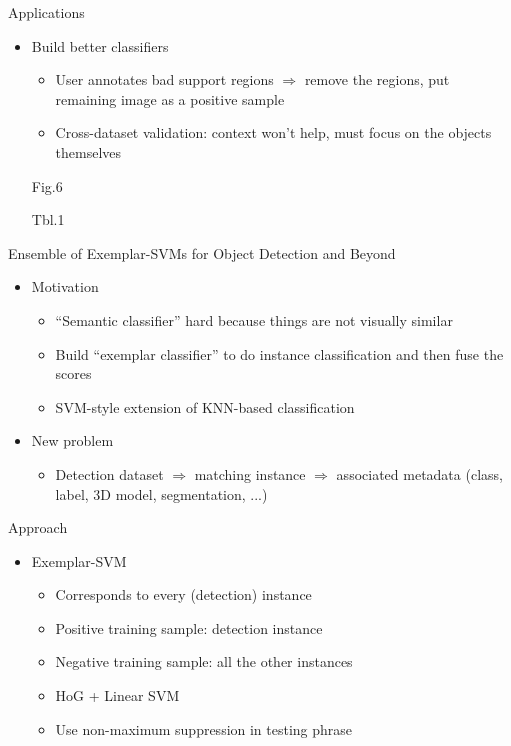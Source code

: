 \documentclass[12pt]{beamer}
\begin{document}
\begin{frame}{Applications}
    \begin{itemize}
        \item Build better classifiers
        \begin{itemize}
            \item User annotates bad support regions $\Rightarrow$ remove the regions, put remaining image as a positive sample
            \item Cross-dataset validation: context won't help, must focus on the objects themselves
        \end{itemize}
        \item [Fig.6]
        \item [Tbl.1]
    \end{itemize}
\end{frame}

\begin{frame}{Ensemble of Exemplar-SVMs for Object Detection and Beyond}
	\begin{itemize}
		\item Motivation
		\begin{itemize}
			\item ``Semantic classifier'' hard because things are not visually similar
			\item Build ``exemplar classifier'' to do instance classification and then fuse the scores
			\item SVM-style extension of KNN-based classification
		\end{itemize}
		\item New problem
		\begin{itemize}
			\item Detection dataset $\Rightarrow$ matching instance $\Rightarrow$ associated metadata (class, label, 3D model, segmentation, ...)
		\end{itemize}
	\end{itemize}
\end{frame}

\begin{frame}{Approach}
	\begin{itemize}
		\item Exemplar-SVM
		\begin{itemize}
			\item Corresponds to every (detection) instance
			\item Positive training sample: detection instance
			\item Negative training sample: all the other instances
			\item HoG + Linear SVM
			\item Use non-maximum suppression in testing phrase
		\end{itemize}
	\end{itemize}
\end{frame}
\end{document}
